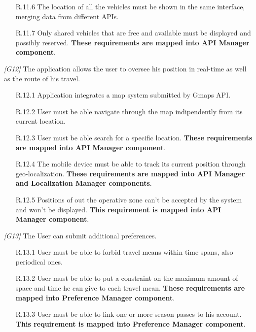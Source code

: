 \begin{description}
\begin{itemize}
			\item [R.11.6] The location of all the vehicles must be shown in the same interface, merging data from different APIs.

			\item[R.11.7] Only shared vehicles that are free and available must be displayed and possibly reserved.
			\textbf{These requirements are mapped into API Manager component}.
		\end{itemize}


	\item \textit{[G12]} The application allows the user to oversee his position in real-time as well as the route of his travel.
		\begin{itemize}
			\item [R.12.1] Application integrates a map system submitted by Gmaps API.

			\item [R.12.2] User must be able navigate through the map indipendently from its current location.

			\item [R.12.3] User must be able search for a specific location.
			\textbf{These requirements are mapped into API Manager component}.

			\item [R.12.4] The mobile device must be able to track its current position through geo-localization.
			\textbf{These requirements are mapped into API Manager and Localization Manager components}.

			\item [R.12.5] Positions of out the operative zone can't be accepted by the system and won't be displayed.			
			\textbf{This requirement is mapped into API Manager component}.

		\end{itemize}


	\item \textit{[G13]} The User can submit additional preferences.
		\begin{itemize}
			\item[R.13.1] User must be able to forbid travel means within time spans, also periodical ones.

			\item[R.13.2] User must be able to put a constraint on the maximum amount of space and time he can give to each travel mean.
			\textbf{These requirements are mapped into Preference Manager component}.

			\item[R.13.3] User must be able to link one or more season passes to his account.
			\textbf{This requirement is mapped into Preference Manager component}.
			

\end{itemize}
\end{description}
